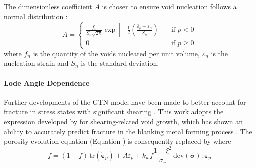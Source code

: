 \documentclass[sn-mathphys,Numbered,draft]{sn-jnl}%
\newcommand{\bb}{\boldsymbol}
\begin{document}
The dimensionless coefficient $A$ is chosen to ensure void nucleation follows a normal distribution \cite{chu_void_1980}:
\begin{equation} \label{eqn:nucleatonA}
	A =
	\begin{cases}
	\frac{f_n}{S_n \sqrt{2 \pi}} \exp \left[-\frac{1}{2}\left(\frac{\bar{\varepsilon}_p-\varepsilon_n}{S_n}\right)\right] & \text { if } p < 0 \\
	0 & \text { if } p \geq 0
	\end{cases}
\end{equation}
where $f_n$ is the quantity of the voids nucleated per unit volume, $\varepsilon_n$ is the nucleation strain and $S_n$ is the standard deviation. 



\paragraph{Lode Angle Dependence}

Further developments of the GTN model have been made to better account for fracture in stress states with significant shearing \cite{nahshon_modification_2008, malcher_continuum_2012, leclerc_micromechanics-based_2020, achouri_numerical_2013}.
This work adopts the expression developed by \citet{nahshon_modification_2008} for shearing-related void growth, which has shown an ability to accurately predict fracture in the blanking metal forming process \cite{achouri_numerical_2013}.
The porosity evolution equation (Equation \label{eqn:GTN4}) is consequently replaced by
where
\begin{equation}
	\dot{f} = (1-f) \, \text{tr}\left(\dot{\boldsymbol{\varepsilon}}_p\right)+A \dot{\bar{\varepsilon}}_p
	+ k_w f\frac{1 - \xi^2 }{\sigma_v} \,\text{dev}(\bb{\sigma}):{\dot{\boldsymbol{\varepsilon}}}_p
\end{equation}
\end{document}
